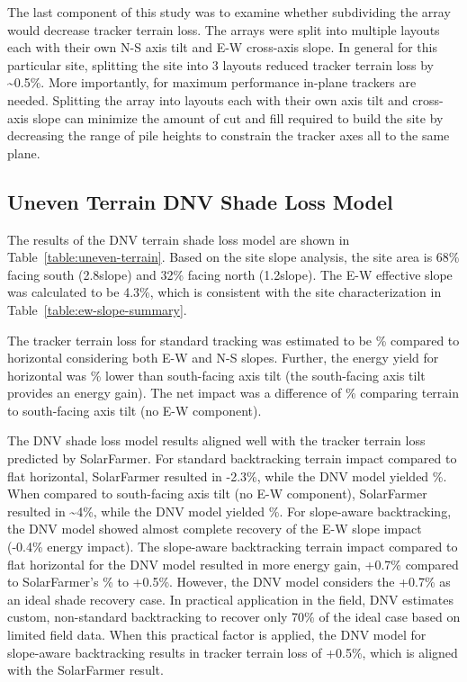 \documentclass[conference]{IEEEtran}
\begin{document}
The last component of this study was to examine whether subdividing the array would decrease tracker terrain loss. The arrays were split into multiple layouts each with their own N-S axis tilt and E-W cross-axis slope. In general for this particular site, splitting the site into 3 layouts reduced tracker terrain loss by \textasciitilde 0.5\%. More importantly, for maximum performance in-plane trackers are needed. Splitting the array into layouts each with their own axis tilt and cross-axis slope can minimize the amount of cut and fill required to build the site by decreasing the range of pile heights to constrain the tracker axes all to the same plane.

\subsection{Uneven Terrain DNV Shade Loss Model}
The results of the DNV terrain shade loss model are shown in Table~\ref{table:uneven-terrain}. Based on the site slope analysis, the site area is 68\% facing south (2.8\degree  slope) and 32\% facing north (1.2\degree  slope). The E-W effective slope was calculated to be 4.3\%, which is consistent with the site characterization in Table~\ref{table:ew-slope-summary}. 

The tracker terrain loss for standard tracking was estimated to be \% compared to horizontal considering both E-W and N-S slopes. Further, the energy yield for horizontal was \% lower than south-facing axis tilt (the south-facing axis tilt provides an energy gain). The net impact was a difference of \% comparing terrain to south-facing axis tilt (no E-W component). 

The DNV shade loss model results aligned well with the tracker terrain loss predicted by SolarFarmer. For standard backtracking terrain impact compared to flat horizontal, SolarFarmer resulted in -2.3\%, while the DNV model yielded \%. When compared to south-facing axis tilt (no E-W component), SolarFarmer resulted in \textasciitilde4\%, while the DNV model yielded \%. For slope-aware backtracking, the DNV model showed almost complete recovery of the E-W slope impact (-0.4\% energy impact). The slope-aware backtracking terrain impact compared to flat horizontal for the DNV model resulted in more energy gain, +0.7\% compared to SolarFarmer's \% to +0.5\%. However, the DNV model considers the +0.7\% as an ideal shade recovery case. In practical application in the field, DNV estimates custom, non-standard backtracking to recover only 70\% of the ideal case based on limited field data. When this practical factor is applied, the DNV model for slope-aware backtracking results in tracker terrain loss of +0.5\%, which is aligned with the SolarFarmer result.
\end{document}
